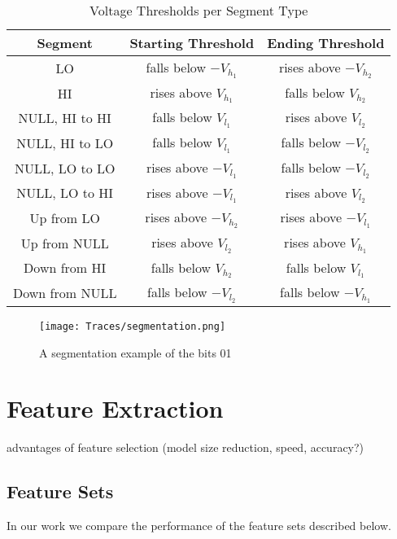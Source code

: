 \documentclass[conference]{IEEEtran}
\begin{document}
  \begin{table}
    \caption{Voltage Thresholds per Segment Type}
    \label{tab:SegmentationLevels}
    \centering
    \begin{tabular}{|c c c|} 
      \hline
      Segment & Starting Threshold & Ending Threshold \\ [0.5ex] 
      \hline\hline
      LO & falls below $-V_{h_1}$ & rises above $-V_{h_2}$ \\
      \hline
      HI & rises above $V_{h_1}$ & falls below $V_{h_2}$ \\
      \hline
      NULL, HI to HI & falls below $V_{l_1}$ & rises above $V_{l_2}$ \\
      \hline
      NULL, HI to LO & falls below $V_{l_1}$ & falls below $-V_{l_2}$ \\
      \hline
      NULL, LO to LO & rises above $-V_{l_1}$ & falls below $-V_{l_2}$ \\
      \hline
      NULL, LO to HI & rises above $-V_{l_1}$ & rises above $V_{l_2}$ \\
      \hline
      Up from LO & rises above $-V_{h_2}$ & rises above $-V_{l_1}$ \\
      \hline
      Up from NULL & rises above $V_{l_2}$ & rises above $V_{h_1}$ \\
      \hline
      Down from HI & falls below $V_{h_2}$ & falls below $V_{l_1}$ \\
      \hline
      Down from NULL & falls below $-V_{l_2}$ & falls below $-V_{h_1}$ \\
      \hline
    \end{tabular}
  \end{table}
  
  \begin{figure}[t]
    \centering
    \texttt{[image: Traces/segmentation.png]}
    \caption{A segmentation example of the bits 01}
    \label{fig:SegmentationTrace}
  \end{figure}
  
\section{Feature Extraction} \label{FeatureExtraction}
  \color{gray}
  advantages of feature selection (model size reduction, speed, accuracy?)
  \color{black}

\subsection{Feature Sets}
  In our work we compare the performance of the feature sets described below.
  
\end{document}
